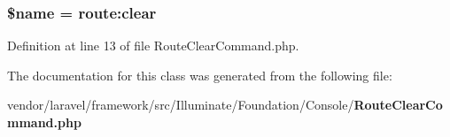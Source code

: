 \subsubsection[{\$name}]{\setlength{\rightskip}{0pt plus 5cm}\${\bf name} = \textquotesingle{}route\+:clear\textquotesingle{}\hspace{0.3cm}{\ttfamily [protected]}}\label{class_illuminate_1_1_foundation_1_1_console_1_1_route_clear_command_ab2fc40d43824ea3e1ce5d86dee0d763b}


Definition at line 13 of file Route\+Clear\+Command.\+php.



The documentation for this class was generated from the following file\+:\begin{DoxyCompactItemize}
\item 
vendor/laravel/framework/src/\+Illuminate/\+Foundation/\+Console/{\bf Route\+Clear\+Command.\+php}\end{DoxyCompactItemize}
